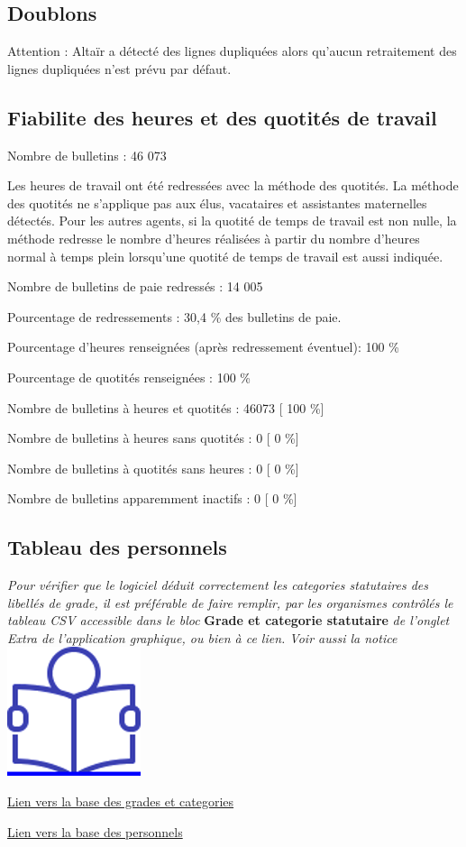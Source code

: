 \hypertarget{doublons}{%
\subsection{Doublons}\label{doublons}}

Attention : Altaïr a détecté des lignes dupliquées alors qu'aucun
retraitement des lignes dupliquées n'est prévu par défaut.

\hypertarget{fiabilite-des-heures-et-des-quotites-de-travail}{%
\subsection{Fiabilite des heures et des quotités de
travail}\label{fiabilite-des-heures-et-des-quotites-de-travail}}

Nombre de bulletins : 46 073

Les heures de travail ont été redressées avec la méthode des quotités.
La méthode des quotités ne s'applique pas aux élus, vacataires et
assistantes maternelles détectés. Pour les autres agents, si la quotité
de temps de travail est non nulle, la méthode redresse le nombre
d'heures réalisées à partir du nombre d'heures normal à temps plein
lorsqu'une quotité de temps de travail est aussi indiquée.

Nombre de bulletins de paie redressés : 14 005

Pourcentage de redressements : 30,4 \% des bulletins de paie.

Pourcentage d'heures renseignées (après redressement éventuel): 100 \%

Pourcentage de quotités renseignées : 100 \%

Nombre de bulletins à heures et quotités : 46073 {[} 100 \%{]}

Nombre de bulletins à heures sans quotités : 0 {[} 0 \%{]}

Nombre de bulletins à quotités sans heures : 0 {[} 0 \%{]}

Nombre de bulletins apparemment inactifs : 0 {[} 0 \%{]}

\hypertarget{tableau-des-personnels}{%
\subsection{Tableau des personnels}\label{tableau-des-personnels}}

\emph{Pour vérifier que le logiciel déduit correctement les categories
statutaires des libellés de grade, il est préférable de faire remplir,
par les organismes contrôlés le tableau CSV accessible dans le bloc}
\textbf{Grade et categorie statutaire} \emph{de l'onglet Extra de
l'application graphique, ou bien à ce lien. Voir aussi la notice} ~
\href{../Docs/Notices/fiche_tableau_categories.odt}{\includegraphics{icones/Notice.png}}

\href{../Bases/Effectifs/grades.categories.csv}{Lien vers la base des
grades et categories}

\href{../Bases/Effectifs/matricules.csv}{Lien vers la base des personnels}
